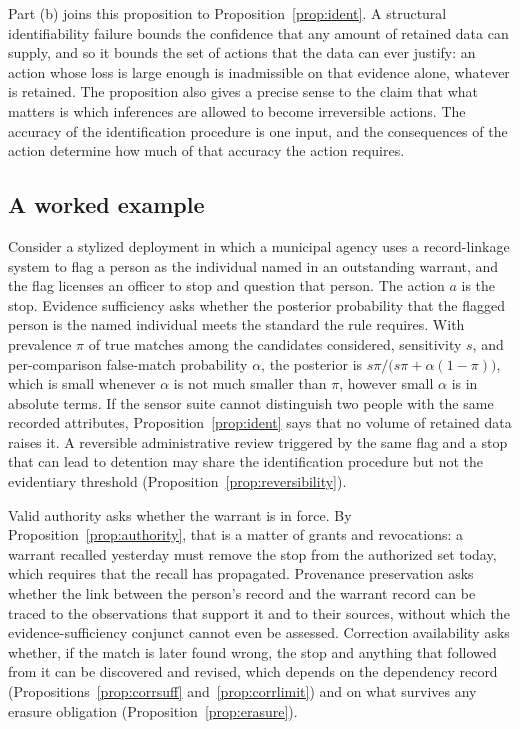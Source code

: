 \documentclass[11pt]{article}
\theoremstyle{plain}
\theoremstyle{definition}
\theoremstyle{remark}
\begin{document}
Part (b) joins this proposition to Proposition~\ref{prop:ident}. A structural identifiability failure bounds the confidence that any amount of retained data can supply, and so it bounds the set of actions that the data can ever justify: an action whose loss is large enough is inadmissible on that evidence alone, whatever is retained. The proposition also gives a precise sense to the claim that what matters is which inferences are allowed to become irreversible actions. The accuracy of the identification procedure is one input, and the consequences of the action determine how much of that accuracy the action requires.

\subsection{A worked example}

Consider a stylized deployment in which a municipal agency uses a record-linkage system to flag a person as the individual named in an outstanding warrant, and the flag licenses an officer to stop and question that person. The action $a$ is the stop. Evidence sufficiency asks whether the posterior probability that the flagged person is the named individual meets the standard the rule requires. With prevalence $\pi$ of true matches among the candidates considered, sensitivity $s$, and per-comparison false-match probability $\alpha$, the posterior is $s\pi/\bigl(s\pi+\alpha(1-\pi)\bigr)$, which is small whenever $\alpha$ is not much smaller than $\pi$, however small $\alpha$ is in absolute terms. If the sensor suite cannot distinguish two people with the same recorded attributes, Proposition~\ref{prop:ident} says that no volume of retained data raises it. A reversible administrative review triggered by the same flag and a stop that can lead to detention may share the identification procedure but not the evidentiary threshold (Proposition~\ref{prop:reversibility}).

Valid authority asks whether the warrant is in force. By Proposition~\ref{prop:authority}, that is a matter of grants and revocations: a warrant recalled yesterday must remove the stop from the authorized set today, which requires that the recall has propagated. Provenance preservation asks whether the link between the person's record and the warrant record can be traced to the observations that support it and to their sources, without which the evidence-sufficiency conjunct cannot even be assessed. Correction availability asks whether, if the match is later found wrong, the stop and anything that followed from it can be discovered and revised, which depends on the dependency record (Propositions~\ref{prop:corrsuff} and~\ref{prop:corrlimit}) and on what survives any erasure obligation (Proposition~\ref{prop:erasure}).
\end{document}

